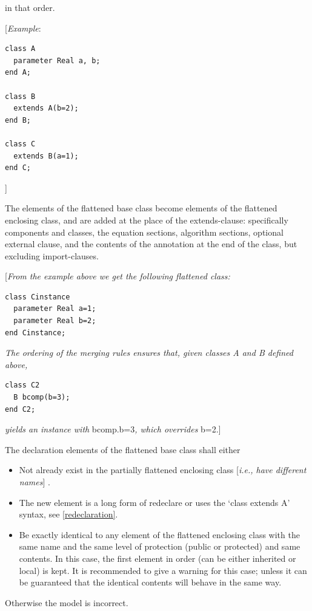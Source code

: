 \documentclass[10pt,a4paper]{report}
\begin{document}
in that order.

{[}\emph{Example}:
\begin{lstlisting}[language=modelica]
class A
  parameter Real a, b;
end A;

class B
  extends A(b=2);
end B;

class C
  extends B(a=1);
end C;
\end{lstlisting}
{]}

The elements of the flattened base class become elements of the
flattened enclosing class, and are added at the place of the
extends-clause: specifically components and classes, the equation
sections, algorithm sections, optional external clause, and the contents
of the annotation at the end of the class, but excluding import-clauses.

{[}\emph{From the example above we get the following flattened class:}
\begin{lstlisting}[language=modelica]
class Cinstance
  parameter Real a=1;
  parameter Real b=2;
end Cinstance;
\end{lstlisting}

\emph{The ordering of the merging rules ensures that, given classes A
and B defined above, }
\begin{lstlisting}[language=modelica]
class C2
  B bcomp(b=3);
end C2;
\end{lstlisting}

\emph{yields an instance with} bcomp.b=3\emph{, which overrides} b=2.{]}

The declaration elements of the flattened base class shall either

\begin{itemize}
\item
  Not already exist in the partially flattened enclosing class
  {[}\emph{i.e., have different names}{]} .
\item
  The new element is a long form of redeclare or uses the `class extends
  A' syntax, see \ref{redeclaration}.
\item
  Be exactly identical to any element of the flattened enclosing class
  with the same name and the same level of protection (public or
  protected) and same contents. In this case, the first element in order
  (can be either inherited or local) is kept. It is recommended to give
  a warning for this case; unless it can be guaranteed that the
  identical contents will behave in the same way.
\end{itemize}

Otherwise the model is incorrect.
\end{document}
